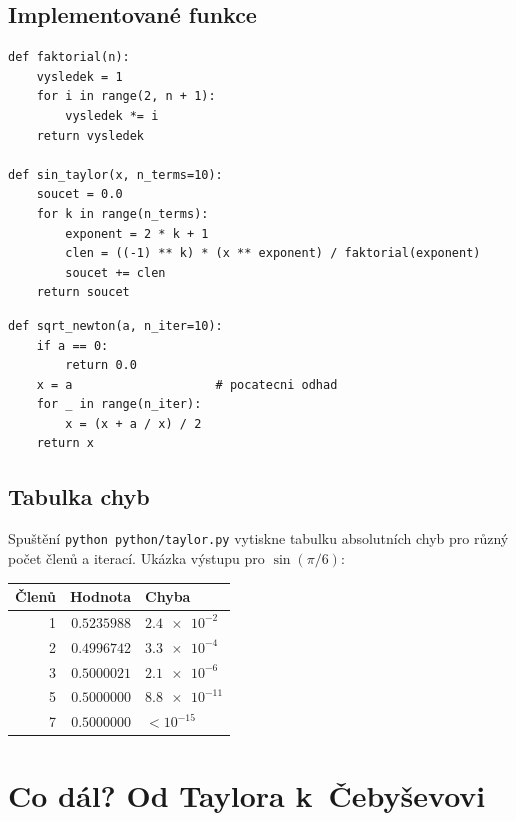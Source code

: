 \documentclass[12pt, a4paper]{article}
\begin{document}
\subsection{Implementované funkce}

\begin{lstlisting}[caption={Taylorova řada pro $\sin(x)$.}]
def faktorial(n):
    vysledek = 1
    for i in range(2, n + 1):
        vysledek *= i
    return vysledek

def sin_taylor(x, n_terms=10):
    soucet = 0.0
    for k in range(n_terms):
        exponent = 2 * k + 1
        clen = ((-1) ** k) * (x ** exponent) / faktorial(exponent)
        soucet += clen
    return soucet
\end{lstlisting}

\begin{lstlisting}[caption={Newtonova iterace pro $\sqrt{a}$.}]
def sqrt_newton(a, n_iter=10):
    if a == 0:
        return 0.0
    x = a                    # pocatecni odhad
    for _ in range(n_iter):
        x = (x + a / x) / 2
    return x
\end{lstlisting}

\subsection{Tabulka chyb}

Spuštění \texttt{python python/taylor.py} vytiskne tabulku absolutních
chyb pro různý počet členů a iterací. Ukázka výstupu pro $\sin(\pi/6)$:

\begin{center}
\begin{tabular}{@{}rrl@{}}
\toprule
Členů & Hodnota          & Chyba        \\ \midrule
1     & $\num{0.5235988}$ & $\num{2.4e-2}$ \\
2     & $\num{0.4996742}$ & $\num{3.3e-4}$ \\
3     & $\num{0.5000021}$ & $\num{2.1e-6}$ \\
5     & $\num{0.5000000}$ & $\num{8.8e-11}$ \\
7     & $\num{0.5000000}$ & $< 10^{-15}$ \\ \bottomrule
\end{tabular}
\end{center}

\section{Co dál? Od Taylora k~Čebyševovi}
\end{document}
